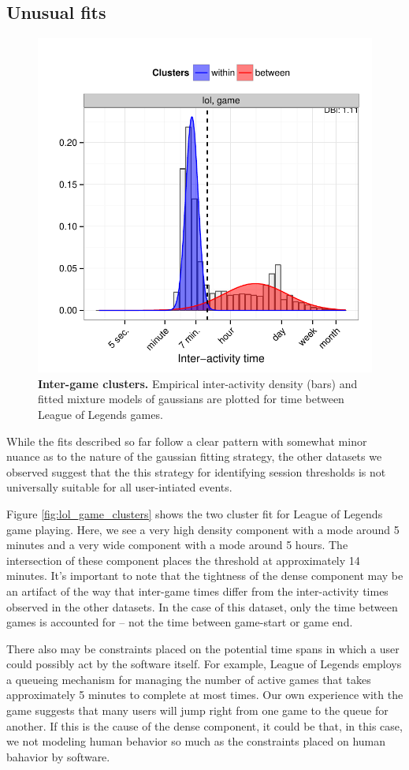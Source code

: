 \subsection{Unusual fits}
\begin{figure}
\centering
\includegraphics[width=.45\textwidth]{figures/weird_lol_clusters.pdf}
\caption{
    \textbf{Inter-game clusters.} Empirical inter-activity density (bars) and fitted mixture models of gaussians are plotted for time between League of Legends games.
}
\end{figure}
While the fits described so far follow a clear pattern with somewhat minor nuance as to the nature of the gaussian fitting strategy, the other datasets we observed suggest that the this strategy for identifying session thresholds is not universally suitable for all user-intiated events.

Figure \ref{fig:lol_game_clusters} shows the two cluster fit for League of Legends game playing.  Here, we see a very high density component with a mode around 5 minutes and a very wide component with a mode around 5 hours.  The intersection of these component places the threshold at approximately 14 minutes.  It's important to note that the tightness of the dense component may be an artifact of the way that inter-game times differ from the inter-activity times observed in the other datasets.  In the case of this dataset, only the time between games is accounted for -- not the time between game-start or game end.

There also may be constraints placed on the potential time spans in which a user could possibly act by the software itself.  For example, League of Legends employs a queueing mechanism for managing the number of active games that takes approximately 5 minutes to complete at most times.  Our own experience with the game suggests that many users will jump right from one game to the queue for another.  If this is the cause of the dense component, it could be that, in this case, we not modeling human behavior so much as the constraints placed on human bahavior by software.

